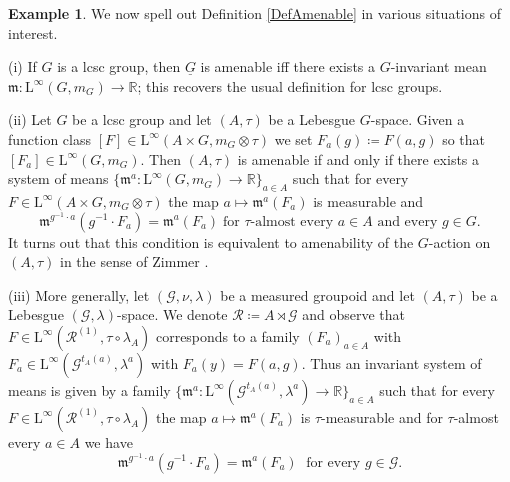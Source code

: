 \documentclass[11pt, oneside]{amsart}
\theoremstyle{definition}
\newtheorem{example}[lemma]{Example}
\theoremstyle{remark}
\theoremstyle{TheoremNum}
\renewcommand{\L}{\mathfrak}
\newcommand{\Linf}{\mathrm{L}^{\infty}}
\newcommand{\cG}{\mathcal{G}}
\newcommand{\cR}{\mathcal{R}}
\newcommand{\bR}{\mathbb{R}}
\begin{document}
\begin{example}\label{ExAmenable} We now spell out Definition \ref{DefAmenable} in various situations of interest.

\item (i) If $G$ is a lcsc group, then $\underline{G}$ is amenable iff there exists a $G$-invariant mean $\L m: \Linf(G,m_G) \to \bR$; this recovers the usual definition for lcsc groups.

\item (ii) Let $G$ be a lcsc group and let $(A, \tau)$ be a Lebesgue $G$-space. Given a function class $[F] \in  \Linf(A \times G,m_G\otimes \tau)$ we set $F_a(g) \coloneqq  F(a,g)$ so that $[F_a] \in \Linf(G,m_G)$. Then $(A, \tau)$ is amenable if and only if there exists a system of means $\{\L m^a:\Linf(G,m_G)\to \mathbb{R}\}_{a\in A}$ such that for every $F \in \Linf(A \times G,m_G\otimes \tau)$ the map $a\mapsto \L m^a(F_a)$ is measurable and 
\[
\L m^{g^{-1}\cdot a}(g^{-1}\cdot F_a)=\L m^a(F_a) \; \text{for $\tau$-almost every $a\in A$ and every $g\in G$.}
\]
It turns out that this condition is equivalent to amenability of the $G$-action on $(A, \tau)$ in the sense of Zimmer \cite{delaroche:renault:libro}.

\item (iii)  More generally, let $(\cG, \nu, \lambda)$ be a measured groupoid and let $(A,\tau)$ be a Lebesgue $(\mathcal{G},\lambda)$-space. We denote $\cR \coloneqq A \rtimes \cG$ and observe that $F \in \Linf(\cR^{(1)}, \tau \circ \lambda_A)$ corresponds to a family $(F_a)_{a \in A}$ with $F_a \in \Linf(\cG^{t_A(a)}, \lambda^{a})$ with $F_a(y) = F(a,g)$. Thus an invariant system of means is given by a family  $\{\L m^{a}:\Linf(\cG^{t_A(a)}, \lambda^{a})\to \mathbb{R}\}_{a\in A}$ such that for every $F \in \Linf(\cR^{(1)}, \tau \circ \lambda_A)$ the map $a\mapsto  \L m^a(F_a)$ is $\tau$-measurable and for $\tau$-almost every $a\in A$ we have
  \begin{equation}\label{eq:ISM:action}
    \L m^{g^{-1}\cdot a} (g^{-1}\cdot F_{ a}) = \L m^{ a}(F_a) \; \text{ for every $g\in\mathcal{G}$.}
   \end{equation}


\end{example}
\end{document}

